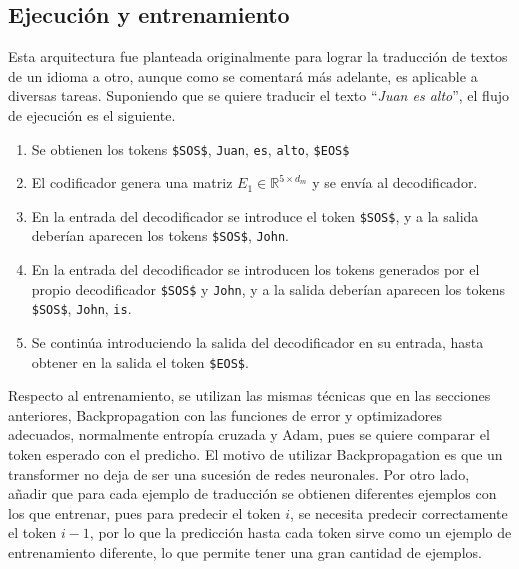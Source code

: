 			\subsection{Ejecución y entrenamiento}
			
				Esta arquitectura fue planteada originalmente para lograr la traducción de textos de un idioma a otro, aunque como se comentará más adelante, es aplicable a diversas tareas. Suponiendo que se quiere traducir el texto ``\textit{Juan es alto}'', el flujo de ejecución es el siguiente. 
				\begin{enumerate}[label = \textbf{\arabic*. }]
					\item Se obtienen los tokens \texttt{\$SOS\$}, \texttt{Juan}, \texttt{es}, \texttt{alto}, \texttt{\$EOS\$}
					\item El codificador genera una matriz $E_1 \in \mathbb{R}^{5 \times d_m}$ y se envía al decodificador. 
					\item En la entrada del decodificador se introduce el token \texttt{\$SOS\$}, y a la salida deberían aparecen los tokens \texttt{\$SOS\$}, \texttt{John}. 
					\item En la entrada del decodificador se introducen los tokens generados por el propio decodificador \texttt{\$SOS\$} y \texttt{John}, y a la salida deberían aparecen los tokens \texttt{\$SOS\$}, \texttt{John}, \texttt{is}.
					\item Se continúa introduciendo la salida del decodificador en su entrada, hasta obtener en la salida el token \texttt{\$EOS\$}.
				\end{enumerate}
				
				Respecto al entrenamiento, se utilizan las mismas técnicas que en las secciones anteriores, Backpropagation con las funciones de error y optimizadores adecuados, normalmente entropía cruzada y Adam, pues se quiere comparar el token esperado con el predicho. El motivo de utilizar Backpropagation es que un transformer no deja de ser una sucesión de redes neuronales. Por otro lado, añadir que para cada ejemplo de traducción se obtienen diferentes ejemplos con los que entrenar, pues para predecir el token $i$, se necesita predecir correctamente el token $i-1$, por lo que la predicción hasta cada token sirve como un ejemplo de entrenamiento diferente, lo que permite tener una gran cantidad de ejemplos. 